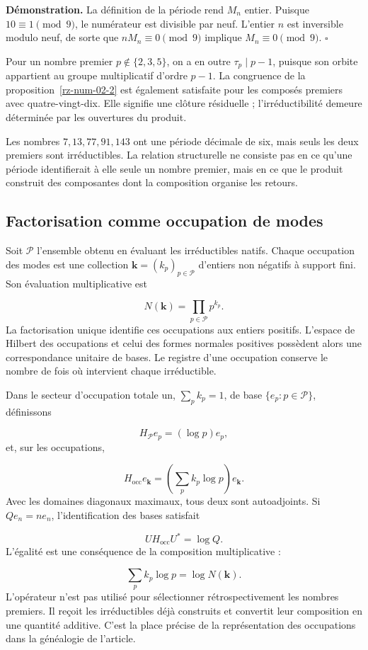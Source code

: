 \textbf{Démonstration.} La définition de la période rend $M_n$ entier. Puisque $10\equiv1\pmod9$, le numérateur est divisible par neuf. L'entier $n$ est inversible modulo neuf, de sorte que $nM_n\equiv0\pmod9$ implique $M_n\equiv0\pmod9$. \hfill\(\square\)

Pour un nombre premier $p\notin\{2,3,5\}$, on a en outre $\tau_p\mid p-1$, puisque son orbite appartient au groupe multiplicatif d’ordre $p-1$. La congruence de la proposition~\ref{rz-num-02-2} est également satisfaite pour les composés premiers avec quatre-vingt-dix. Elle signifie une clôture résiduelle ; l’irréductibilité demeure déterminée par les ouvertures du produit.

Les nombres $7,13,77,91,143$ ont une période décimale de six, mais seuls les deux premiers sont irréductibles. La relation structurelle ne consiste pas en ce qu'une période identifierait à elle seule un nombre premier, mais en ce que le produit construit des composantes dont la composition organise les retours.

\subsection{Factorisation comme occupation de modes}
Soit $\mathcal P$ l'ensemble obtenu en évaluant les irréductibles natifs. Chaque occupation des modes est une collection $\mathbf k=(k_p)_{p\in\mathcal P}$ d'entiers non négatifs à support fini. Son évaluation multiplicative est

\[
N(\mathbf k)=\prod_{p\in\mathcal P}p^{k_p}.
\]
La factorisation unique identifie ces occupations aux entiers positifs. L’espace de Hilbert des occupations et celui des formes normales positives possèdent alors une correspondance unitaire de bases. Le registre d’une occupation conserve le nombre de fois où intervient chaque irréductible.

Dans le secteur d'occupation totale un, \(\sum_p k_p=1\), de base \(\{e_p:p\in\mathcal P\}\), définissons

\[
H_{\mathcal P}e_p=(\log p)e_p,
\]
et, sur les occupations,

\[
H_{\mathrm{occ}}e_{\mathbf k}
=\left(\sum_pk_p\log p\right)e_{\mathbf k}.
\]
Avec les domaines diagonaux maximaux, tous deux sont autoadjoints. Si $Qe_n=ne_n$, l'identification des bases satisfait

\[
U H_{\mathrm{occ}}U^*=\log Q.
\]
L'égalité est une conséquence de la composition multiplicative :

\[
\sum_pk_p\log p=\log N(\mathbf k).
\]
L'opérateur n'est pas utilisé pour sélectionner rétrospectivement les nombres premiers. Il reçoit les irréductibles déjà construits et convertit leur composition en une quantité additive. C'est la place précise de la représentation des occupations dans la généalogie de l'article.


